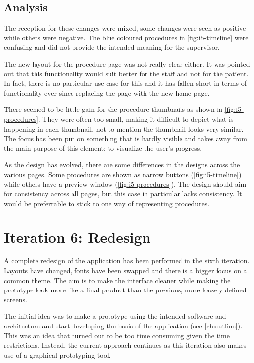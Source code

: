 \subsection{Analysis}

The reception for these changes were mixed, some changes were seen as positive while others were negative. The blue coloured procedures in \autoref{fig:i5-timeline} were confusing and did not provide the intended meaning for the supervisor.

The new layout for the procedure page was not really clear either. It was pointed out that this functionality would suit better for the staff and not for the patient. In fact, there is no particular use case for this and it has fallen short in terms of functionality ever since replacing the page with the new home page.

There seemed to be little gain for the procedure thumbnails as shown in \autoref{fig:i5-procedures}. They were often too small, making it difficult to depict what is happening in each thumbnail, not to mention the thumbnail looks very similar. The focus has been put on something that is hardly visible and takes away from the main purpose of this element; to visualize the user's progress.

As the design has evolved, there are some differences in the designs across the various pages. Some procedures are shown as narrow buttons (\autoref{fig:i5-timeline}) while others have a preview window (\autoref{fig:i5-procedures}). The design should aim for consistency across all pages, but this case in particular lacks consistency. It would be preferrable to stick to one way of representing procedures.

\section{Iteration 6: Redesign}
\label{sec:iteration6}

A complete redesign of the application has been performed in the sixth iteration. Layouts have changed, fonts have been swapped and there is a bigger focus on a common theme. The aim is to make the interface cleaner while making the prototype look more like a final product than the previous, more loosely defined screens.

The initial idea was to make a prototype using the intended software and architecture and start developing the basis of the application (see \autoref{ch:outline}). This was an idea that turned out to be too time consuming given the time restrictions. Instead, the current approach continues as this iteration also makes use of a graphical prototyping tool.

